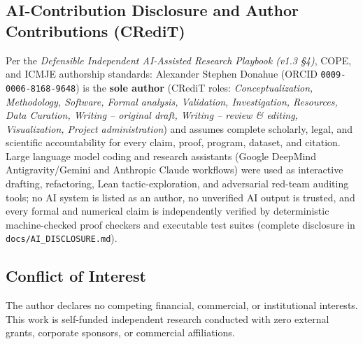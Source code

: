 \documentclass[11pt,reqno]{amsart}
\begin{document}
\subsection*{AI-Contribution Disclosure and Author Contributions (CRediT)}
Per the \emph{Defensible Independent AI-Assisted Research Playbook (v1.3 \S4)}, COPE, and ICMJE authorship standards: Alexander Stephen Donahue (ORCID \texttt{0009-0006-8168-9648}) is the \textbf{sole author} (CRediT roles: \emph{Conceptualization, Methodology, Software, Formal analysis, Validation, Investigation, Resources, Data Curation, Writing -- original draft, Writing -- review \& editing, Visualization, Project administration}) and assumes complete scholarly, legal, and scientific accountability for every claim, proof, program, dataset, and citation. Large language model coding and research assistants (Google DeepMind Antigravity/Gemini and Anthropic Claude workflows) were used as interactive drafting, refactoring, Lean tactic-exploration, and adversarial red-team auditing tools; no AI system is listed as an author, no unverified AI output is trusted, and every formal and numerical claim is independently verified by deterministic machine-checked proof checkers and executable test suites (complete disclosure in \nolinkurl{docs/AI_DISCLOSURE.md}).

\subsection*{Conflict of Interest}
The author declares no competing financial, commercial, or institutional interests. This work is self-funded independent research conducted with zero external grants, corporate sponsors, or commercial affiliations.



\end{document}
